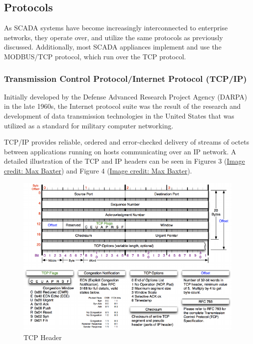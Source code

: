 \documentclass[12pt,]{article}
\begin{document}
\subsection{Protocols}\label{protocols}

As SCADA systems have become increasingly interconnected to enterprise
networks, they operate over, and utilize the same protocols as
previously discussed. Additionally, most SCADA appliances implement and
use the MODBUS/TCP protocol, which run over the TCP protocol.

\subsubsection{Transmission Control Protocol/Internet Protocol
(TCP/IP)}\label{transmission-control-protocolinternet-protocol-tcpip}

Initially developed by the Defense Advanced Research Project Agency
(DARPA) in the late 1960s, the Internet protocol suite was the result of
the research and development of data transmission technologies in the
United States that was utilized as a standard for military computer
networking.

TCP/IP provides reliable, ordered and error-checked delivery of streams
of octets between applications running on hosts communicating over an IP
network. A detailed illustration of the TCP and IP headers can be seen
in Figures 3
(\href{http://nmap.org/book/images/hdr/MJB-TCP-Header}{Image credit: Max
Baxter}) and Figure 4
(\href{http://nmap.org/book/images/hdr/MJB-IP-Header}{Image credit: Max
Baxter}).

\begin{figure}

{\centering \includegraphics{thesis_files/figure-latex/unnamed-chunk-6-1} 

}

\caption{TCP Header}\label{fig:unnamed-chunk-6}
\end{figure}
\end{document}
